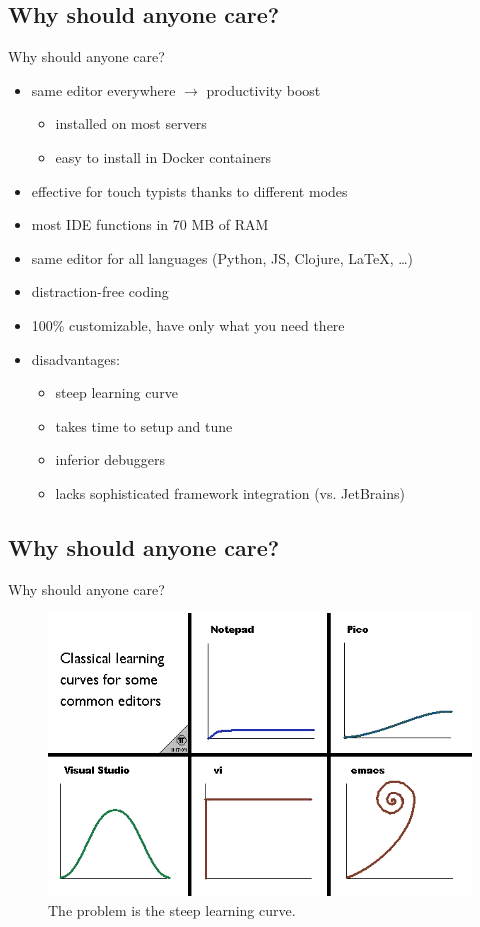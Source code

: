 \documentclass[xcolor=x11names,compress,t]{beamer}
\renewcommand{\(}{\begin{columns}[T]}
\renewcommand{\)}{\end{columns}}
\newcommand{\<}[1]{\begin{column}{#1}}
\renewcommand{\>}{\end{column}}
\newenvironment{slide}[1]{\subsection{#1} \begin{frame}{#1}}{\end{frame}}
\begin{document}
\begin{slide}{Why should anyone care?}
    \begin{itemize} 
        \item same editor everywhere $\longrightarrow$ productivity boost
            \begin{itemize}
                \item installed on most servers
                \item easy to install in Docker containers
            \end{itemize}
        \item effective for touch typists thanks to different modes
        \item most IDE functions in 70 MB of RAM
        \item same editor for all languages (Python, JS, Clojure, LaTeX, \dots)
        \item distraction-free coding
        \item 100\% customizable, have only what you need there
        \item disadvantages:
            \begin{itemize}
                \item steep learning curve
                \item takes time to setup and tune
                \item inferior debuggers
                \item lacks sophisticated framework integration (vs. JetBrains)
            \end{itemize}
    \end{itemize}
\end{slide}

\begin{slide}{Why should anyone care?}
    \begin{figure}
        \includegraphics[scale=0.6]{editor-learning-curves}
        \caption{The problem is the steep learning curve.}
    \end{figure}
\end{slide}
\end{document}
